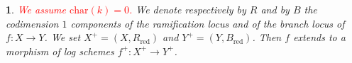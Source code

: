 \documentclass{amsart}%
\numberwithin{equation}{subsection}
\theoremstyle{plain2}
\theoremstyle{definition2}
\newtheorem{rem}[equation]{Remark}
\theoremstyle{stepstyle}
\theoremstyle{point}
\theoremstyle{subpoint}
\newtheorem{subpoint}[equation]{}%
\newcommand{\spa}[1]{\begin{subpoint}#1\end{subpoint}}           %
\newcommand{\cX}{\ensuremath{\mathscr{X}}}
\newcommand{\cY}{\ensuremath{\mathscr{Y}}}
\renewcommand{\cY}{\ensuremath{\mathscr{Y}}}
\newcommand{\Spec}{\ensuremath{\mathrm{Spec}\,}}
\newcommand{\redu}{\mathrm{red}}
\begin{document}
%

\spa{\textcolor{red}{We assume $\text{char}(k)=0$.} We denote respectively by $R$ and by $B$ the codimension $1$ components of the ramification locus and of the branch locus of $f:X \rightarrow Y$. We set $X^+=(X,R_\redu)$ and $Y^+=(Y,B_\redu)$. Then $f$ extends to a morphism of log schemes $f^+:X^+ \rightarrow Y^+$.
}
\end{document}

